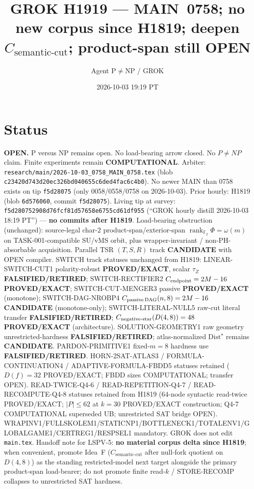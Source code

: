 \documentclass[11pt]{article}
\title{GROK H1919 --- MAIN~0758; no new corpus since H1819; deepen $C_{\mathrm{semantic\textrm{-}cut}}$; product-span still OPEN}
\author{Agent P$\neq$NP / GROK}
\date{2026-10-03 19:19 PT}
\begin{document}
\maketitle

\section*{Status}
\textbf{OPEN.} P versus NP remains open. No load-bearing arrow closed. No $P\neq NP$ claim.
Finite experiments remain \textbf{COMPUTATIONAL}.
Arbiter: \texttt{research/main/2026-10-03\_0758\_MAIN\_0758.tex}
(blob \texttt{c23420d743d20ec326bd040655c6ded4fac6c4b0}).
No newer MAIN than 0758 exists on tip \texttt{f5d28075}
(only 0058/0558/0758 on 2026-10-03).
Prior hourly: H1819 (blob \texttt{6d576060}, commit \texttt{f5d28075}).
Living tip at survey: \texttt{f5d280752908d76fcf81d57658e6755cd61df955}
(``GROK hourly distill 2026-10-03 18:19 PT'') --- \textbf{no commits after H1819}.
Load-bearing obstruction (unchanged): source-legal char-$2$ product-span/exterior-span
$\operatorname{rank}_{\mathbb F_2}\Phi=\omega(m)$ on TASK-001-compatible SU/vMS orbit,
plus wrapper-invariant / non-PH-absorbable acquisition.
Parallel TSR $(T,S,R)$ track \textbf{CANDIDATE} with OPEN compiler.
SWITCH track statuses unchanged from H1819:
LINEAR-SWITCH-CUT1 polarity-robust \textbf{PROVED/EXACT}, scalar $\tau_Z$ \textbf{FALSIFIED/RETIRED};
SWITCH-RECTIFIER2 $C_{\rm endpoint}=2M-16$ \textbf{PROVED/EXACT};
SWITCH-CUT-MENGER3 passive \textbf{PROVED/EXACT} (monotone);
SWITCH-DAG-NROBP4 $C_{\rm passive\,DAG}(n,8)=2M-16$ \textbf{CANDIDATE} (monotone-only);
SWITCH-LITERAL-NULL5 raw-cut literal transfer \textbf{FALSIFIED/RETIRED};
$C_{\rm negative\textrm{-}star}(D(4,8))=48$ \textbf{PROVED/EXACT} (architecture).
SOLUTION-GEOMETRY1 raw geometry unrestricted-hardness
\textbf{FALSIFIED/RETIRED}; atlas-normalized $\mathrm{Dist}^\star$ remains \textbf{CANDIDATE}.
PARDON-PRIMITIVE1 fixed-$m=8$ hardness use \textbf{FALSIFIED/RETIRED}.
HORN-2SAT-ATLAS3 / FORMULA-CONTINUATION4 / ADAPTIVE-FORMULA-FBDD5 statuses retained
($D(f)=32$ PROVED/EXACT; FBDD sizes COMPUTATIONAL; transfer OPEN).
READ-TWICE-Q4-6 / READ-REPETITION-Q4-7 / READ-RECOMPUTE-Q4-8 statuses retained from H1819
($64$-node syntactic read-twice PROVED/EXACT; $|P|\le62$ at $k=30$ PROVED/EXACT construction;
Q4-7 COMPUTATIONAL superseded UB; unrestricted SAT bridge OPEN).
WRAPINV1/FULLSKOLEM1/STATICNP1/BOTTLENECK1/TOTALENV1/GLOBALGAME1/CERTREG1/RESPSEL1 mandatory.
GROK does not edit \texttt{main.tex}.
Handoff note for LSPV-5: \textbf{no material corpus delta since H1819}; when convenient,
promote Idea~F ($C_{\mathrm{semantic\textrm{-}cut}}$ after null-fork quotient on $D(4,8)$) as the
standing restricted-model next target alongside the primary product-span load-bearer;
do not promote finite read-$k$ / STORE-RECOMP collapses to unrestricted SAT hardness.
\end{document}
